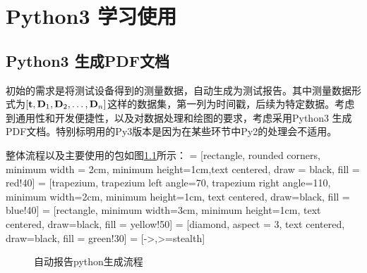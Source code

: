\chapter{Python3 学习使用}
\section{Python3 生成PDF文档}
初始的需求是将测试设备得到的测量数据，自动生成为测试报告。其中测量数据形式为$[\bf{t}, \bf{D}_1, \bf{D}_2, \dots, \bf{D}_n]$这样的数据集，第一列为时间戳，后续为特定数据。考虑到通用性和开发便捷性，以及对数据处理和绘图的要求，考虑采用Python3 生成PDF文档。特别标明用的Py3版本是因为在某些环节中Py2的处理会不适用。

整体流程以及主要使用的包如图\ref{fig: PDF流程}所示：
 = [rectangle, rounded corners, minimum width = 2cm, minimum height=1cm,text centered, draw = black, fill = red!40]
 = [trapezium, trapezium left angle=70, trapezium right angle=110, minimum width=2cm, minimum height=1cm, text centered, draw=black, fill = blue!40]
 = [rectangle, minimum width=3cm, minimum height=1cm, text centered, draw=black, fill = yellow!50]
 = [diamond, aspect = 3, text centered, draw=black, fill = green!30]
 = [->,>=stealth]

\begin{figure}[htbp]
\centering
{}
\caption{\label{fig: PDF流程} 自动报告python生成流程}
\end{figure}

